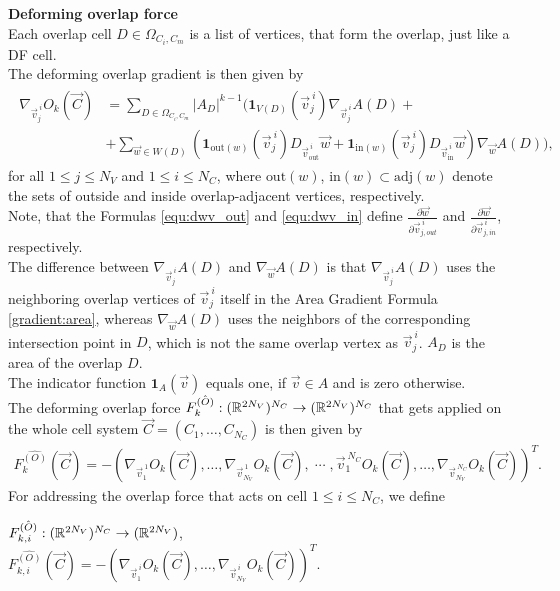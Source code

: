 \begin{proposition} \textbf{Deforming overlap force} \\
	Each overlap cell $D \in \Omega_{C_i,C_m}$ is a list of vertices, that form the overlap, just like a DF cell. \\
	The deforming overlap gradient is then given by 
	\begin{align}
		\begin{split}
			\nabla_{\vec{v}_j^{\: i}} O_k(\vec{C}) &= \sum\limits_{D \in \Omega_{C_i,C_m}}  |A_{D}|^{k-1} \Biggl(\mathbf{1}_{V(D)}(\vec{v}_j^{\: i}) \nabla_{\vec{v}_j^{\: i}}A(D)  + \\[0.5em]
				    							   &+ \sum\limits_{\vec{w} \in W(D)} \left(\mathbf{1}_{\text{out}(w)}(\vec{v}_{j}^{\: i}) D_{\vec{v}_{\text{out}}^{\: i}} \vec{w} %
													+ \mathbf{1}_{\text{in}(w)}(\vec{v}_j^{\: i}) D_{\vec{v}_{\text{in}}^{\: i}} \vec{w} \right) \nabla_{\vec{w}}A(D)\Biggr),
		\end{split}
	\end{align}
	for all $1 \leq j \leq N_V$ and $1 \leq i \leq N_C$, where $\text{out}(w)$, $\text{in}(w) \subset \text{adj}(w)$ denote the sets of outside and inside overlap-adjacent vertices, respectively. \\
	Note, that the Formulas \ref{equ:dwv_out} and \ref{equ:dwv_in} define $\frac{\partial \vec{w}}{\partial \vec{v}_{j, out}^{\: i}}$ and $\frac{\partial \vec{w}}{\partial \vec{v}_{j, in}^{\: i}}$, respectively. \\
	The difference between $\nabla_{\vec{v}_j^{\: i}}A(D)$ and $\nabla_{\vec{w}}A(D)$ is that $\nabla_{\vec{v}_j^{\: i}}A(D)$ uses the neighboring overlap vertices of $\vec{v}_j^{\: i}$ itself in the Area Gradient Formula \ref{gradient:area}, whereas $\nabla_{\vec{w}}A(D)$ uses the neighbors of the corresponding intersection point in $D$, which is not the same overlap vertex as $\vec{v}_j^{\: i}$.
    $A_{D}$ is the area of the overlap $D$.\\
	The indicator function $\mathbf{1}_{A}(\vec{v})$ equals one, if $\vec{v} \in A$ and is zero otherwise. \\
	The deforming overlap force $F_{k}^{\hat{(O)}}: (\mathbb{R}^{2 N_V})^{N_C} \rightarrow (\mathbb{R}^{2 N_V})^{N_C}$ that gets applied on the whole cell system $\vec{C} = (C_1, \ldots, C_{N_C})$ is then given by  
	\begin{align*}
		F_{k}^{\hat{(O)}}(\vec{C}) 
		= - (\nabla_{\vec{v}_1^{\:1}} O_k(\vec{C}), \ldots, \nabla_{\vec{v}_{N_V}^{\:1}} O_k(\vec{C}), \; \cdots \;, \vec{v}_1^{\:N_C} O_k(\vec{C}), \ldots, \nabla_{\vec{v}_{N_V}^{\:N_C}} O_k(\vec{C}))^T.
	\end{align*}
	For addressing the overlap force that acts on cell $1 \leq i \leq N_C$, we define 
	\begin{center}
		$F_{k, i}^{\hat{(O)}}: (\mathbb{R}^{2 N_V})^{N_C} \rightarrow (\mathbb{R}^{2 N_V})$, \\
		$F_{k, i}^{\hat{(O)}}(\vec{C}) = - (\nabla_{\vec{v}_1^{\:i}} O_k(\vec{C}), \ldots, \nabla_{\vec{v}_{N_V}^{\:i}} O_k(\vec{C}))^T$. 
	\end{center}


\end{proposition}
